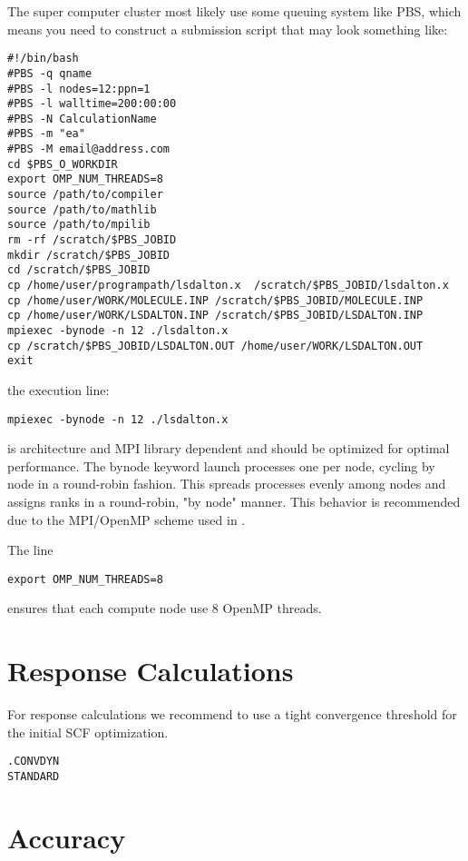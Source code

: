 The super computer cluster most likely use some queuing system like PBS, which means you need to construct a submission script that may look something like:

\begin{verbatim}
#!/bin/bash                                                                     
#PBS -q qname
#PBS -l nodes=12:ppn=1
#PBS -l walltime=200:00:00                                                      
#PBS -N CalculationName
#PBS -m "ea"                                                                    
#PBS -M email@address.com
cd $PBS_O_WORKDIR
export OMP_NUM_THREADS=8
source /path/to/compiler
source /path/to/mathlib
source /path/to/mpilib
rm -rf /scratch/$PBS_JOBID
mkdir /scratch/$PBS_JOBID
cd /scratch/$PBS_JOBID
cp /home/user/programpath/lsdalton.x  /scratch/$PBS_JOBID/lsdalton.x
cp /home/user/WORK/MOLECULE.INP /scratch/$PBS_JOBID/MOLECULE.INP
cp /home/user/WORK/LSDALTON.INP /scratch/$PBS_JOBID/LSDALTON.INP
mpiexec -bynode -n 12 ./lsdalton.x
cp /scratch/$PBS_JOBID/LSDALTON.OUT /home/user/WORK/LSDALTON.OUT
exit
\end{verbatim}

the execution line: 
\begin{verbatim}
mpiexec -bynode -n 12 ./lsdalton.x
\end{verbatim}
is architecture and MPI library dependent and should be optimized for optimal performance. 
The bynode keyword launch processes one per node, cycling by node in a round-robin fashion. This spreads processes evenly among nodes and assigns ranks in a round-robin, "by node" manner. This behavior is recommended due to the MPI/OpenMP scheme used in {\lsdalton}.

The line
\begin{verbatim}
export OMP_NUM_THREADS=8
\end{verbatim}
ensures that each compute node use 8 OpenMP threads. 

\section{Response Calculations}

For response calculations we recommend to use a tight convergence threshold for the initial SCF optimization. 

\begin{verbatim}
.CONVDYN
STANDARD
\end{verbatim}

\section{Accuracy}

